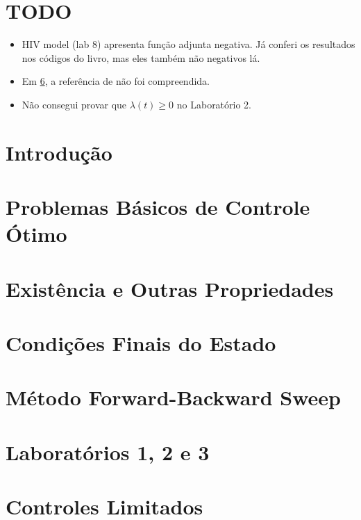 \documentclass[a4paper, 11pt, oneside]{book}
\newcommand{\la}{\lambda}
\theoremstyle{definition}
\begin{document}


\tableofcontents

\chapter{TODO}

\begin{itemize}
    \item HIV model (lab 8) apresenta função adjunta negativa. Já conferi os
    resultados nos códigos do livro, mas eles também não negativos lá. 
    \item Em \ref{ch:4}, a referência de \cite{wolfgang1978} não foi
    compreendida. 
    \item Não consegui provar que $\la(t) \ge 0$ no Laboratório 2. 
\end{itemize}

\chapter{Introdução}
\label{ch:intro}


\chapter{Problemas Básicos de Controle Ótimo}
\label{ch:1}


\chapter{Existência e Outras Propriedades}
\label{ch:2}


\chapter{Condições Finais do Estado}
\label{ch:3}


\chapter{Método Forward-Backward Sweep}
\label{ch:4}


\chapter{Laboratórios 1, 2 e 3}
\label{labs123}


\chapter{Controles Limitados}
\label{ch:8}

\end{document}
